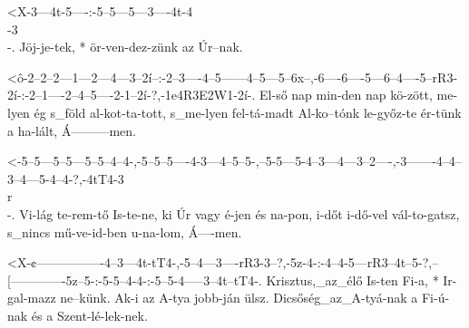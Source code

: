 




  {<X-3---4t-5----:-5--5---5---3----4t-4\\-3\\-.}
  {   Jöj-je-tek, * ör-ven-dez-zünk az Úr--nak.}


  {<ô-2--2--2---1---2---4---3--2í--:-2--3----4--5------4--5---5--6x--,-6----6----5---6--4----5--rR3-2í-:-2--1----2--4--5----2-1--2í-?,-1e4R3E2W1-2í-.}
  {   El-ső nap min-den nap kö-zött, me-lyen ég s_föld al-kot-ta-tott, s_me-lyen fel-tá-madt Al-ko--tónk le-győz-te ér-tünk a ha-lált, Á---------men.}


  {<-5--5---5--5---5--5--4--4-,-5--5--5----4-3---4--5--5-,--5-5---5-4--3---4---3--2----,-3-------4--4--3--4---5-4--4-?,-4tT4-3\\r\\-.}
  {  Vi-lág te-rem-tő Is-te-ne, ki Úr vagy é-jen és na-pon, i-dőt i-dő-vel vál-to-gatsz, s_nincs mű-ve-id-ben u-na-lom, Á----men.}

  {<X-¢----------------4--3---4t-tT4-,-5--4---3----rR3-3--?,-5z-4-:-4--4-5---rR3--4t--5-?,--[-------------5z--5-:-5-5--4-4-:-5--5-4-----3--4t--tT4-.}
  {   Krisztus,_az_élő Is-ten Fi-a,  * Ir-gal-mazz ne--künk. Ak-i   az A-tya jobb-ján ülsz. Dicsőség_az_A-tyá-nak a Fi-ú-nak és a Szent-lé-lek-nek.}


